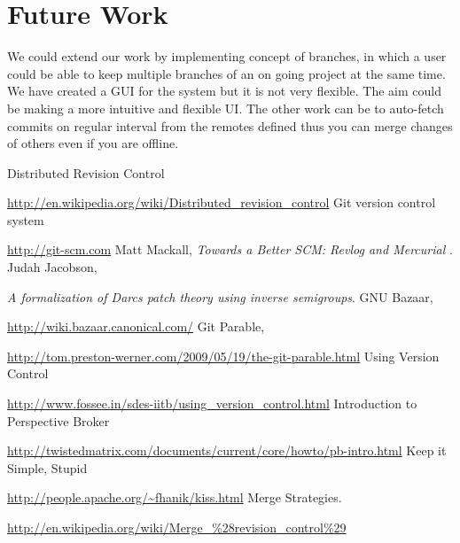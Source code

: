 \documentclass[12pt]{article}
\begin{document}
\section{Future Work}
We could extend our work by implementing concept of branches, in which a user
could be able to keep multiple branches of an on going project at the same
time. We have created a GUI for the system but it is not very flexible. The
aim could be making a more intuitive and flexible UI. The other work can be to
auto-fetch commits on regular interval from the remotes defined thus you can
merge changes of others even if you are offline.
\begin{thebibliography}{99}
Distributed Revision Control

\url{http://en.wikipedia.org/wiki/Distributed_revision_control}
Git version control system

\url{http://git-scm.com}
Matt Mackall, \emph{Towards a Better SCM: Revlog and Mercurial} .
Judah Jacobson,

\emph{A formalization of Darcs patch theory using inverse
  semigroups}.
GNU Bazaar,

\url{http://wiki.bazaar.canonical.com/}
Git Parable,

\url{http://tom.preston-werner.com/2009/05/19/the-git-parable.html}
Using Version Control

\url{http://www.fossee.in/sdes-iitb/using_version_control.html}
Introduction to Perspective Broker

\url{http://twistedmatrix.com/documents/current/core/howto/pb-intro.html}
Keep it Simple, Stupid

\url{http://people.apache.org/~fhanik/kiss.html}
Merge Strategies.

\url{http://en.wikipedia.org/wiki/Merge_%28revision_control%29}
\end{thebibliography}
\end{document}
